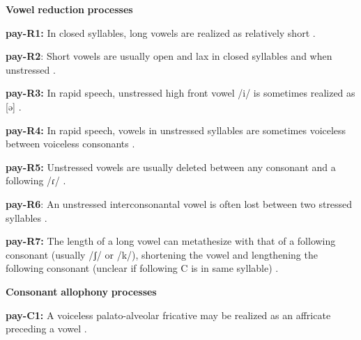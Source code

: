\begin{styleBody}
\textbf{Vowel} \textbf{reduction} \textbf{processes}
\end{styleBody}

\begin{styleBody}
\textbf{pay-R1:} In closed syllables, long vowels are realized as relatively short \citep[18]{Holt1999}.
\end{styleBody}

\begin{styleBody}
\textbf{pay-R2}: Short vowels are usually open and lax in closed syllables and when unstressed \citep[18]{Holt1999}.
\end{styleBody}

\begin{styleBody}
\textbf{pay-R3:} In rapid speech, unstressed high front vowel /i/ is sometimes realized as [ə] \citep[18]{Holt1999}.
\end{styleBody}

\begin{styleBody}
\textbf{pay-R4:} In rapid speech, vowels in unstressed syllables are sometimes voiceless between voiceless consonants \citep[18]{Holt1999}.
\end{styleBody}

\begin{styleBody}
\textbf{pay-R5:} Unstressed vowels are usually deleted between any consonant and a following /ɾ/ \citep[23]{Holt1999}.
\end{styleBody}

\begin{styleBody}
\textbf{pay-R6}: An unstressed interconsonantal vowel is often lost between two stressed syllables \citep[23]{Holt1999}.
\end{styleBody}

\begin{styleBody}
\textbf{pay-R7:} The length of a long vowel can metathesize with that of a following consonant (usually /ʃ/ or /k/), shortening the vowel and lengthening the following consonant (unclear if following C is in same syllable) \citep[24-5]{Holt1999}.
\end{styleBody}

\begin{styleBody}
\textbf{Consonant} \textbf{allophony} \textbf{processes}
\end{styleBody}

\begin{styleBody}
\textbf{pay-C1:} A voiceless palato-alveolar fricative may be realized as an affricate preceding a vowel \citep[16]{Holt1999}.
\end{styleBody}

